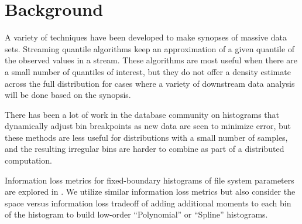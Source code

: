 \documentclass[preprint]{sig-alternate-per}
\begin{document}

\section{Background}

A variety of techniques have been developed to make synopses of
massive data sets.  Streaming quantile algorithms
\cite{chambers2006monitoring} keep an approximation of a given
quantile of the observed values in a stream.  These algorithms are
most useful when there are a small number of quantiles of interest,
but they do not offer a density estimate across the full distribution
for cases where a variety of downstream data analysis will be done
based on the synopsis.

There has been a lot of work in the database community on histograms
that dynamically adjust bin breakpoints as new data are seen to
minimize error, but these methods are less useful for distributions
with a small number of samples, and the resulting irregular bins are
harder to combine as part of a distributed computation.

Information loss metrics for fixed-boundary histograms of file system parameters are
explored in \cite{douceur1999large}. We utilize similar information
loss metrics but also consider the space versus information loss
tradeoff of adding additional moments to each bin of the histogram to
build low-order ``Polynomial'' \cite{sagae1997bin} or ``Spline''
\cite{Poosala:1997:HET:269157} histograms.





\end{document}
